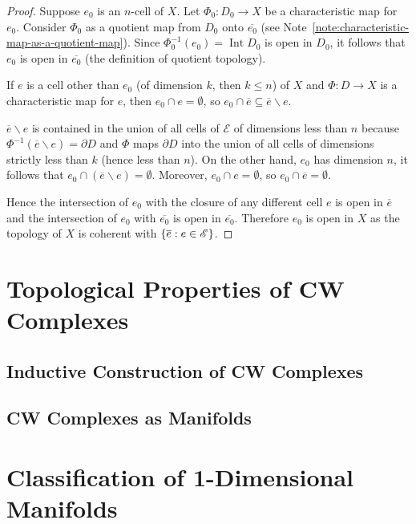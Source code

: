 \begin{proof}
	Suppose $e_{0}$ is an $n$-cell of $X$. Let $\Phi_{0}: D_{0} \to X$ be a characteristic map for $e_{0}$. Consider $\Phi_{0}$ as a quotient map from $D_{0}$ onto $\overline{e_{0}}$ (see Note~\ref{note:characteristic-map-as-a-quotient-map}). Since $\Phi_{0}^{-1}(e_{0}) = \operatorname{Int} D_{0}$ is open in $D_{0}$, it follows that $e_{0}$ is open in $\overline{e_{0}}$ (the definition of quotient topology).

	If $e$ is a cell other than $e_{0}$ (of dimension $k$, then $k \leq n$) of $X$ and $\Phi: D \to X$ is a characteristic map for $e$, then $e_{0} \cap e = \emptyset$, so $e_{0} \cap \overline{e} \subseteq \overline{e} \smallsetminus e$.

	$\overline{e}\smallsetminus e$ is contained in the union of all cells of $\mathscr{E}$ of dimensions less than $n$ because $\Phi^{-1}(\overline{e}\smallsetminus e) = \partial D$ and $\Phi$ maps $\partial D$ into the union of all cells of dimensions strictly less than $k$ (hence less than $n$). On the other hand, $e_{0}$ has dimension $n$, it follows that $e_{0} \cap (\overline{e}\smallsetminus e) = \emptyset$. Moreover, $e_{0} \cap e = \emptyset$, so $e_{0} \cap \overline{e} = \emptyset$.

	Hence the intersection of $e_{0}$ with the closure of any different cell $e$ is open in $\overline{e}$ and the intersection of $e_{0}$ with $\overline{e_{0}}$ is open in $\overline{e_{0}}$. Therefore $e_{0}$ is open in $X$ as the topology of $X$ is coherent with $\left\{{ \overline{e}: e \in \mathscr{E} }\right\}$.
\end{proof}

\section{Topological Properties of CW Complexes}

\subsection{Inductive Construction of CW Complexes}

\subsection{CW Complexes as Manifolds}

\section{Classification of 1-Dimensional Manifolds}

